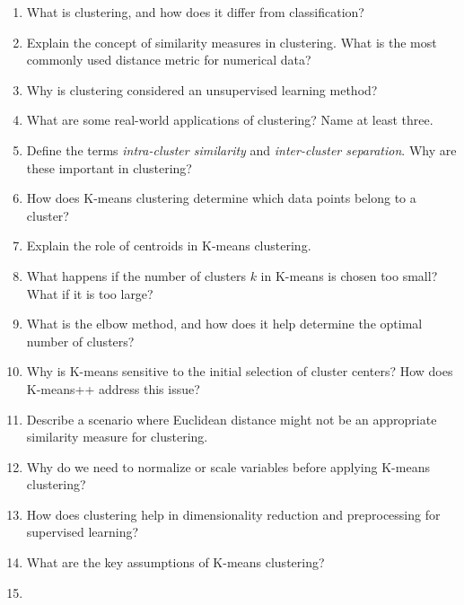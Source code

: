 \documentclass[
  11pt,
]{book}
\providecommand{\tightlist}{%
  \setlength{\itemsep}{0pt}\setlength{\parskip}{0pt}}
\theoremstyle{definition}
\theoremstyle{definition}
\theoremstyle{definition}
\theoremstyle{definition}
\theoremstyle{remark}
\begin{document}
\begin{enumerate}
\def\labelenumi{\arabic{enumi}.}
\tightlist
\item
  What is clustering, and how does it differ from classification?\\
\item
  Explain the concept of similarity measures in clustering. What is the most commonly used distance metric for numerical data?\\
\item
  Why is clustering considered an unsupervised learning method?\\
\item
  What are some real-world applications of clustering? Name at least three.\\
\item
  Define the terms \emph{intra-cluster similarity} and \emph{inter-cluster separation}. Why are these important in clustering?\\
\item
  How does K-means clustering determine which data points belong to a cluster?\\
\item
  Explain the role of centroids in K-means clustering.\\
\item
  What happens if the number of clusters \(k\) in K-means is chosen too small? What if it is too large?\\
\item
  What is the elbow method, and how does it help determine the optimal number of clusters?\\
\item
  Why is K-means sensitive to the initial selection of cluster centers? How does K-means++ address this issue?\\
\item
  Describe a scenario where Euclidean distance might not be an appropriate similarity measure for clustering.\\
\item
  Why do we need to normalize or scale variables before applying K-means clustering?\\
\item
  How does clustering help in dimensionality reduction and preprocessing for supervised learning?\\
\item
  What are the key assumptions of K-means clustering?\\
\item

\end{enumerate}
\end{document}
